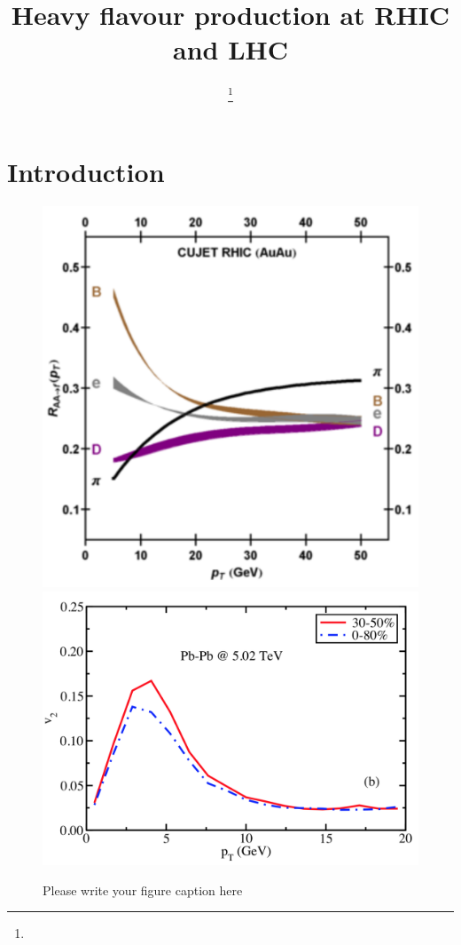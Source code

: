 \documentclass{webofc}
\begin{document}
%
\title{Heavy flavour production at RHIC and LHC}
%
%

\author{ \fnsep\thanks{} 
}


\abstract{%
}
%
\maketitle
%
\section{Introduction}
\label{intro}

\begin{figure}[ht]
\centering
\includegraphics[width=.35\textwidth]{Plots/CUJETRAALHC}
\hspace{1cm}
\includegraphics[width=.50\textwidth]{Plots/v2Dmesons_LBT}
\caption{Please write your figure caption here}
\label{theory}       %
\end{figure}
\end{document}
